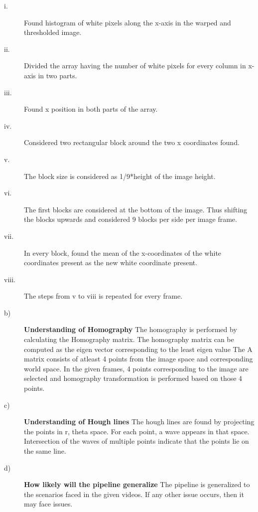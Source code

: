 \documentclass[11pt]{article}
\begin{document}
\begin{description}
\item[i.] Found histogram of white pixels along the x-axis in the warped and thresholded image.
\item[ii.] Divided the array having the number of white pixels for every column in x-axis in two parts.
\item[iii.] Found x position in both parts of the array.
\item[iv.] Considered two rectangular block around the two x coordinates found.
\item[v.] The block size is considered as 1/9*height of the image height.
\item[vi.] The first blocks are considered at the bottom of the image. Thus shifting the blocks upwards and considered 9 blocks per side per image frame.
\item[vii.] In every block, found the mean of the x-coordinates of the white coordinates present as the new white coordinate present.  
\item[viii.] The steps from v to viii is repeated for every frame.   

\item[b)] \textbf{Understanding of Homography}
The homography is performed by calculating the Homography matrix.
The homography matrix can be computed as the eigen vector corresponding to the least eigen value
The A matrix consists of atleast 4 points from the image space and corresponding world space.
In the given frames, 4 points corresponding to the image are selected and homography transformation is performed based on those 4 points.

\item[c)] \textbf{Understanding of Hough lines}
The hough lines are found by projecting the points in r, theta space. For each point, a wave appears in that space. Intersection of the waves of multiple points indicate that the points lie on the same line.

\item[d)] \textbf{How likely will the pipeline generalize}
The pipeline is generalized to the scenarios faced in the given videos. If any other issue occurs, then it may face issues.

\end{description}
\end{document}
